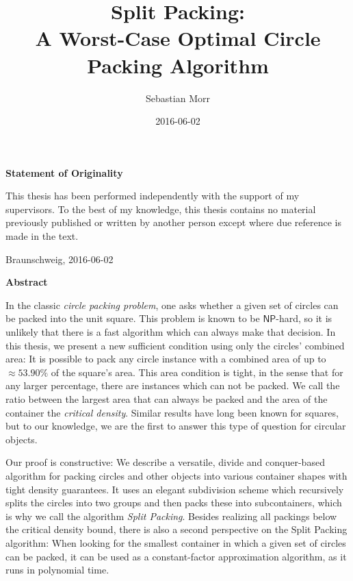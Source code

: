\documentclass[a4paper,style=print,bibliography=totoc,nexus,lnum,extramargin]{tubsbook}
\title{Split Packing:\\ A Worst-Case Optimal Circle Packing Algorithm}
\author{\sffamily\LARGE Sebastian Morr}
\date{\large 2016-06-02}
\begin{document}
\frontmatter %

\maketitle
\cleardoublepage

\thispagestyle{plain}
\vspace*{7cm}
\centerline{\bfseries Statement of Originality}
\vspace*{1em}
\noindent
This thesis has been performed independently with the support of my supervisors.
To the best of my knowledge, this thesis contains no material previously
published or written by another person except where due reference is made in the text.

\par
  \bigskip\noindent Braunschweig, 2016-06-02 \par
  \vspace*{10mm}
  \hfill\hrulefill
\cleardoublepage

\thispagestyle{plain}
\centerline{\bfseries Abstract}
\vspace*{1em}
\noindent

In the classic \emph{circle packing problem}, one asks whether a given set of circles can be packed into the unit square. This problem is known to be $\mathsf{NP}$-hard, so it is unlikely that there is a fast algorithm which can always make that decision.
In this thesis, we present a new sufficient condition using only the circles' combined area: It is possible to pack any circle instance with a combined area of up to $\approx \! 53.90\%$ of the square's area. This area condition is tight, in the sense that for any larger percentage, there are instances which can not be packed. We call the ratio between the largest area that can always be packed and the area of the container the \emph{critical density}. Similar results have long been known for squares, but to our knowledge, we are the first to answer this type of question for circular objects.


Our proof is constructive: We describe a versatile, divide and conquer-based algorithm for packing circles and other objects into various container shapes with tight density guarantees. It uses an elegant subdivision scheme which recursively splits the circles into two groups and then packs these into subcontainers, which is why we call the algorithm \emph{Split Packing}.
Besides realizing all packings below the critical density bound, there is also a second perspective on the Split Packing algorithm: When looking for the smallest container in which a given set of circles can be packed, it can be used as a constant-factor approximation algorithm, as it runs in polynomial time.
\end{document}
